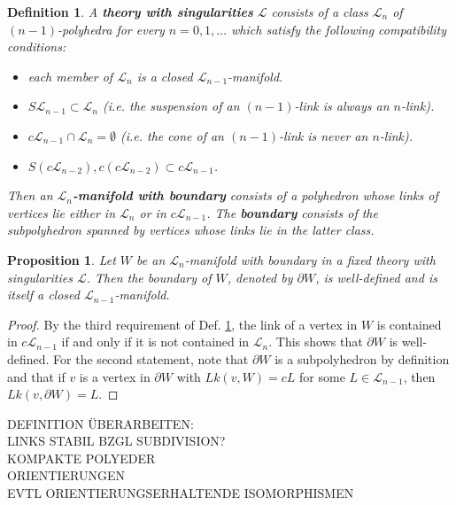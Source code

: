 \documentclass[11pt]{book}
\newtheorem{prop}{Proposition}
\newtheorem{definition}{Definition}
\begin{document}
\begin{definition}\label{theory}
A \textbf{theory with singularities} $\mathcal{L}$ consists of a class $\mathcal{L}_n$ of $(n-1)$-polyhedra for every $n=0,1,...$ which satisfy the following compatibility conditions:
\begin{itemize}
\item[1.] each member of $\mathcal{L}_n$ is a closed $\mathcal{L}_{n-1}$-manifold.
\item[2.] $S \mathcal{L}_{n-1} \subset \mathcal{L}_n$ (i.e. the suspension of an $(n-1)$-link is always an $n$-link).
\item[3.] $c \mathcal{L}_{n-1} \cap \mathcal{L}_n = \emptyset$ (i.e. the cone of an $(n-1)$-link is never an $n$-link).
\item[4.] $S(c\mathcal{L}_{n-2}), c(c \mathcal{L}_{n-2}) \subset c \mathcal{L}_{n-1}$.
\end{itemize}
Then an \textbf{$\mathcal{L}_n$-manifold with boundary} consists of a polyhedron whose links of vertices lie either in $\mathcal{L}_n$ or in $c \mathcal{L}_{n-1}$. The \textbf{boundary} consists of the subpolyhedron spanned by vertices whose links lie in the latter class.
\end{definition}

\begin{prop}
Let $W$ be an $\mathcal{L}_n$-manifold with boundary in a fixed theory with singularities $\mathcal{L}$. Then the boundary of $W$, denoted by $\partial W$, is well-defined and is itself a closed $\mathcal{L}_{n-1}$-manifold.
\end{prop}

\begin{proof}
By the third requirement of Def. \ref{theory}, the link of a vertex in $W$ is contained in $c \mathcal{L}_{n-1}$ if and only if it is not contained in $\mathcal{L}_n$. This shows that $\partial W$ is well-defined. For the second statement, note that $\partial W$ is a subpolyhedron by definition and that if $v$ is a vertex in $\partial W$ with $Lk(v,W)=cL$ for some $L \in \mathcal{L}_{n-1}$, then $Lk(v,\partial W) = L$.
\end{proof}

DEFINITION ÜBERARBEITEN: \\
LINKS STABIL BZGL SUBDIVISION? \\
KOMPAKTE POLYEDER \\
ORIENTIERUNGEN \\
EVTL ORIENTIERUNGSERHALTENDE ISOMORPHISMEN 
\end{document}

